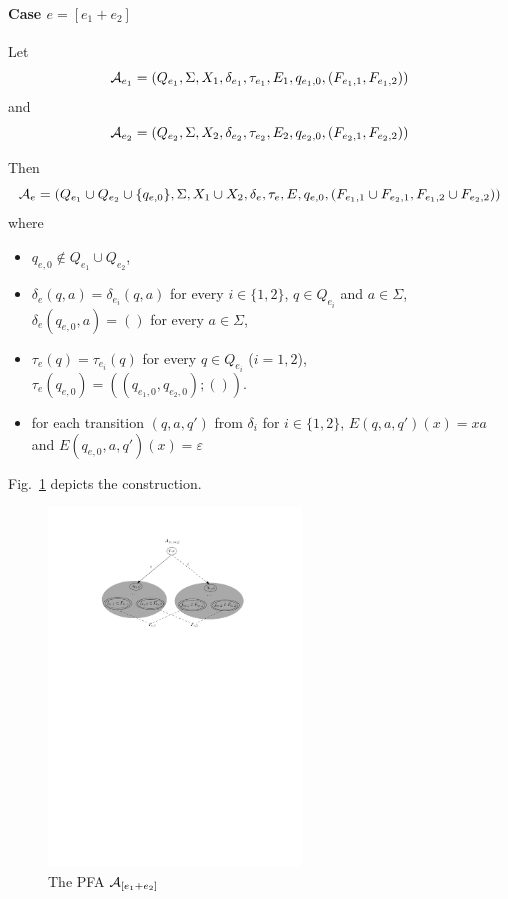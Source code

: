 \paragraph{Case $e = [e_1 + e_2]$} Let 
\[\mathcal{A}_{e_1} = (Q_{e_1}, \Sigma, X_1, \delta_{e_1}, \tau_{e_1}, E_1,  q_{e_1,0}, (F_{e_1,1}, F_{e_1,2}))\] and 
\[\mathcal{A}_{e_2} = (Q_{e_2}, \Sigma, X_2, \delta_{e_2}, \tau_{e_2}, E_2, q_{e_2,0}, (F_{e_2, 1}, F_{e_2,2}))\] 
 
Then 
\[\mathcal{A}_e = (Q_{e_1} \cup Q_{e_2} \cup \{q_{e,0}\}, \Sigma, X_1\cup X_2, 
		\delta_e, \tau_e, E, q_{e,0}, (F_{e_1,1} \cup F_{e_2,1}, F_{e_1,2} \cup F_{e_2,2}))\] where  
		\begin{itemize}
			\item $q_{e,0}  \not \in Q_{e_1} \cup Q_{e_2}$, 
			\item $\delta_e(q, a) = \delta_{e_i}(q, a)$ for every $i \in \{1,2\}$, $q \in Q_{e_i}$ and $a \in \Sigma$, 
			$\delta_e(q_{e,0}, a)  = ()$ for every $a \in \Sigma$, 
			\item $\tau_e(q) = \tau_{e_i}(q)$ for every $q \in Q_{e_i}$ ($i =1,2$), $\tau_e(q_{e,0}) = ((q_{e_1,0},q_{e_2,0}); ())$.
			\item for each transition $(q, a, q')$ from $\delta_i$ for $i\in\{1,2\}$, $E(q,a,q')(x) =xa$ and $E(q_{e,0},a,q')(x) =\varepsilon$
		\end{itemize}
Fig.~\ref{fig-reg2pfa-1} depicts the construction.  	
		\begin{figure}[ht]
			\centering
			\includegraphics[width = 0.6\textwidth]{reg2pfa-1.pdf}
			\caption{The PFA $\mathcal{A}_{[e_1+e_2]}$}
			\label{fig-reg2pfa-1}
		\end{figure}  


